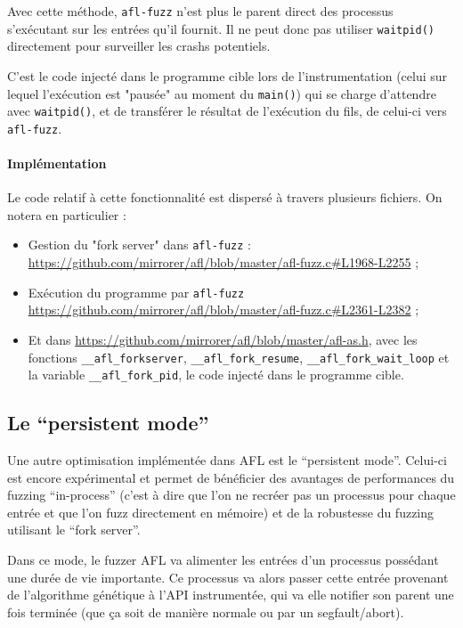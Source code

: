 Avec cette méthode, \lstinline{afl-fuzz} n'est plus le parent direct des processus s'exécutant sur les entrées qu'il fournit.
Il ne peut donc pas utiliser \lstinline{waitpid()} directement pour surveiller les crashs potentiels.

C'est le code injecté dans le programme cible lors de l'instrumentation (celui sur lequel l'exécution est "pausée" au moment du \lstinline{main()}) qui se charge d'attendre avec \lstinline{waitpid()}, et de transférer le résultat de l'exécution du fils, de celui-ci vers \lstinline{afl-fuzz}.

\paragraph{Implémentation}

Le code relatif à cette fonctionnalité est dispersé à travers plusieurs fichiers.
On notera en particulier :
\begin{itemize}
  \item{} Gestion du "fork server" dans \lstinline{afl-fuzz} : \url{https://github.com/mirrorer/afl/blob/master/afl-fuzz.c#L1968-L2255} ;
  \item{} Exécution du programme par \lstinline{afl-fuzz} \url{https://github.com/mirrorer/afl/blob/master/afl-fuzz.c#L2361-L2382} ;
  \item{} Et dans \url{https://github.com/mirrorer/afl/blob/master/afl-as.h}, avec les fonctions \lstinline{__afl_forkserver}, \lstinline{__afl_fork_resume}, \lstinline{__afl_fork_wait_loop} et la variable \lstinline{__afl_fork_pid}, le code injecté dans le programme cible.
\end{itemize}

\subsection{Le ``persistent mode''}\label{persistent-mode}

Une autre optimisation implémentée dans AFL est le ``persistent mode''.
Celui-ci est encore expérimental et permet de bénéficier des avantages de performances du fuzzing ``in-process'' (c'est à dire que l'on ne recréer pas un processus pour chaque entrée et que l'on fuzz directement en mémoire) et de la robustesse du fuzzing utilisant le ``fork server''.

Dans ce mode, le fuzzer AFL va alimenter les entrées d'un processus possédant une durée de vie importante.
Ce processus va alors passer cette entrée provenant de l'algorithme génétique à l'API instrumentée, qui va elle notifier son parent une fois terminée (que ça soit de manière normale ou par un segfault/abort).

